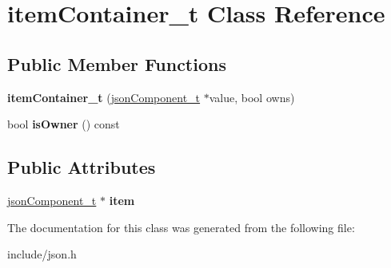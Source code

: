 \hypertarget{classitemContainer__t}{\section{item\-Container\-\_\-t \-Class \-Reference}
\label{classitemContainer__t}
}
\subsection*{\-Public \-Member \-Functions}
\begin{DoxyCompactItemize}
\item 
\hypertarget{classitemContainer__t_a0c849657a0086b135011707c13d8c514}{{\bfseries item\-Container\-\_\-t} (\hyperlink{classjsonComponent__t}{json\-Component\-\_\-t} $\ast$value, bool owns)}\label{classitemContainer__t_a0c849657a0086b135011707c13d8c514}

\item 
\hypertarget{classitemContainer__t_ad0dd6961f5a1b5d304fffeb00be27572}{bool {\bfseries is\-Owner} () const }\label{classitemContainer__t_ad0dd6961f5a1b5d304fffeb00be27572}

\end{DoxyCompactItemize}
\subsection*{\-Public \-Attributes}
\begin{DoxyCompactItemize}
\item 
\hypertarget{classitemContainer__t_a3a6148ceda0c0fa1d93379d1283c3ff0}{\hyperlink{classjsonComponent__t}{json\-Component\-\_\-t} $\ast$ {\bfseries item}}\label{classitemContainer__t_a3a6148ceda0c0fa1d93379d1283c3ff0}

\end{DoxyCompactItemize}


\-The documentation for this class was generated from the following file\-:\begin{DoxyCompactItemize}
\item 
include/json.\-h\end{DoxyCompactItemize}
